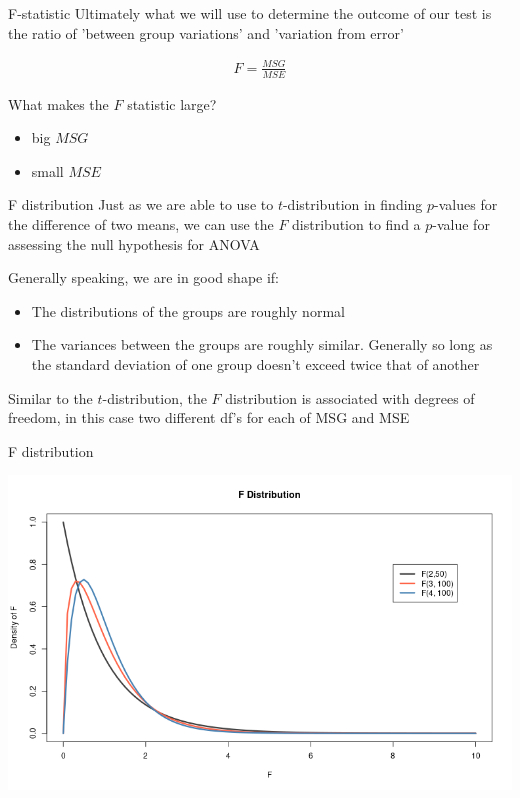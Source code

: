 \documentclass{beamer}
\begin{document}
\begin{frame}{F-statistic}
Ultimately what we will use to determine the outcome of our test is the ratio of 'between group variations' and 'variation from error' 

\begin{align*}
F = \frac{MSG}{MSE} 
\end{align*} \vspace{4mm}

What makes the $F$ statistic large?
\begin{itemize}
\item big $MSG$
\item small $MSE$
\end{itemize}
\end{frame} 


\begin{frame}{F distribution}
Just as we are able to use to $t$-distribution in finding $p$-values for the difference of two means, we can use the $F$ distribution to find a $p$-value for assessing the null hypothesis for ANOVA \vspace{8mm}

Generally speaking, we are in good shape if:
\begin{itemize}
\item The distributions of the groups are roughly normal
\item The variances between the groups are roughly similar. Generally so long as the standard deviation of one group doesn't exceed twice that of another
\end{itemize} \vspace{8mm}

Similar to the $t$-distribution, the $F$ distribution is associated with degrees of freedom, in this case two different df's for each of MSG and MSE
\end{frame}

\begin{frame}{F distribution}
\begin{center}
\includegraphics[scale=0.45]{img/Fdist.png}
\end{center}
\end{frame}
\end{document}

